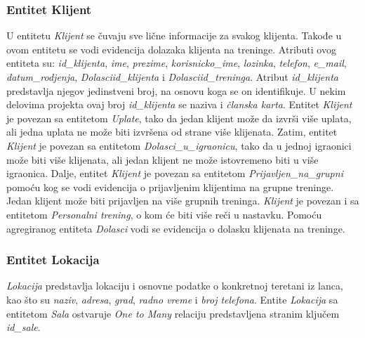 \documentclass[../main.tex]{subfiles}
\begin{document}
\subsubsection{Entitet Klijent}
U entitetu \textit{Klijent} se čuvaju sve lične informacije za svakog klijenta. Takođe u ovom entitetu se vodi evidencija dolazaka klijenta na treninge. Atributi ovog entiteta su:  \textit{id\_klijenta}, \textit{ime}, \textit{prezime}, \textit{korisnicko\_ime}, \textit{lozinka}, \textit{telefon}, \textit{e\_mail}, \textit{datum\_rodjenja}, \textit{Dolasciid\_klijenta} i  \textit{Dolasciid\_treninga}.
Atribut \textit{id\_klijenta} predstavlja njegov jedinstveni broj, na osnovu koga se on identifikuje. U nekim delovima projekta ovaj broj \textit{id\_klijenta} se naziva i \textit{članska karta}. 
Entitet \textit{Klijent} je povezan sa entitetom \textit{Uplate}, tako da jedan klijent može da izvrši više uplata, ali jedna uplata ne može biti izvršena od strane više klijenata. Zatim, entitet \textit{Klijent} je povezan sa entitetom \textit{Dolasci\_u\_igraonicu}, tako da u jednoj igraonici može biti više klijenata, ali jedan klijent ne može istovremeno biti u više igraonica. %
Dalje, entitet \textit{Klijent} je povezan sa entitetom \textit{Prijavljen\_na\_grupni} pomoću kog se vodi evidencija o prijavljenim klijentima na grupne treninge. Jedan klijent može biti prijavljen na više grupnih treninga.
\textit{Klijent} je povezan i sa entitetom \textit{Personalni trening}, o kom će biti više reči u nastavku.
Pomoću agregiranog entiteta \textit{Dolasci} vodi se evidencija o dolasku klijenata na treninge.


\subsubsection{Entitet Lokacija}

\textit{Lokacija} predstavlja lokaciju i osnovne podatke o konkretnoj teretani iz lanca, kao što su \textit{naziv}, \textit{adresa}, \textit{grad}, \textit{radno vreme} i \textit{broj telefona}.
Entite \textit{Lokacija} sa entitetom \textit{Sala} ostvaruje \textit{One to Many} relaciju predstavljena stranim ključem \textit{id\_sale}. 
\end{document}
